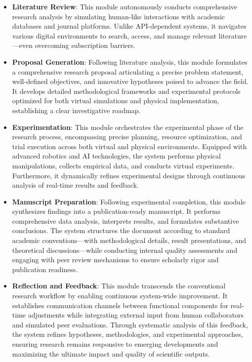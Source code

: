 \begin{itemize}
    \item \textbf{Literature Review}: This module autonomously conducts comprehensive research analysis by simulating human-like interactions with academic databases and journal platforms. Unlike API-dependent systems, it navigates various digital environments to search, access, and manage relevant literature—even overcoming subscription barriers.
    
    
    \item \textbf{Proposal Generation}: Following literature analysis, this module formulates a comprehensive research proposal articulating a precise problem statement, well-defined objectives, and innovative hypotheses poised to advance the field. It develops detailed methodological frameworks and experimental protocols optimized for both virtual simulations and physical implementation, establishing a clear investigative roadmap.
    
    \item \textbf{Experimentation}: This module orchestrates the experimental phase of the research process, encompassing precise planning, resource optimization, and trial execution across both virtual and physical environments. Equipped with advanced robotics and AI technologies, the system performs physical manipulations, collects empirical data, and conducts virtual experiments. Furthermore, it dynamically refines experimental designs through continuous analysis of real-time results and feedback.
    
    \item \textbf{Manuscript Preparation}: Following experimental completion, this module synthesizes findings into a publication-ready manuscript. It performs comprehensive data analysis, interprets results, and formulates substantive conclusions. The system structures the document according to standard academic conventions—with methodological details, result presentations, and theoretical discussions—while conducting internal quality assessments and engaging with peer review mechanisms to ensure scholarly rigor and publication readiness.

    \item \textbf{Reflection and Feedback}: This module transcends the conventional research workflow by enabling continuous system-wide improvement. It establishes communication channels between functional components for real-time adjustments while integrating external input from human collaborators and simulated peer evaluations. Through systematic analysis of this feedback, the system refines hypotheses, methodologies, and experimental approaches, ensuring research remains responsive to emerging developments and maximizing the ultimate impact and quality of scientific outputs.

    
\end{itemize}

